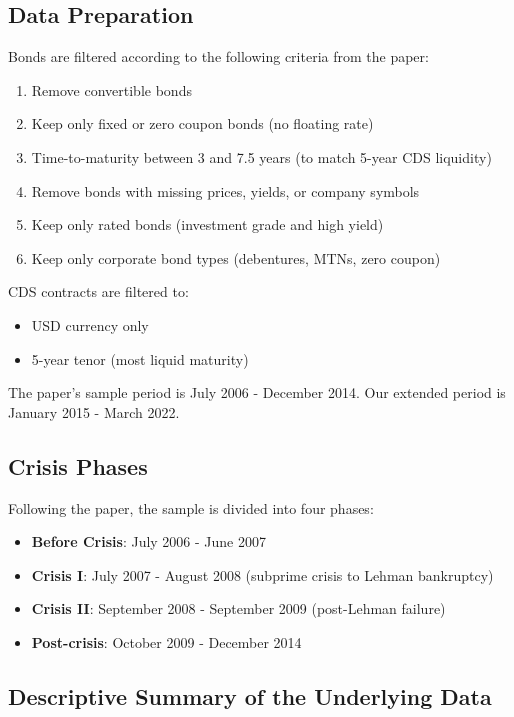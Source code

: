 \documentclass{article}
\begin{document}
\subsection{Data Preparation}

Bonds are filtered according to the following criteria from the paper:
\begin{enumerate}
    \item Remove convertible bonds
    \item Keep only fixed or zero coupon bonds (no floating rate)
    \item Time-to-maturity between 3 and 7.5 years (to match 5-year CDS liquidity)
    \item Remove bonds with missing prices, yields, or company symbols
    \item Keep only rated bonds (investment grade and high yield)
    \item Keep only corporate bond types (debentures, MTNs, zero coupon)
\end{enumerate}

CDS contracts are filtered to:
\begin{itemize}
    \item USD currency only
    \item 5-year tenor (most liquid maturity)
\end{itemize}

The paper's sample period is July 2006 - December 2014. Our extended period is January 2015 - March 2022.

\subsection{Crisis Phases}

Following the paper, the sample is divided into four phases:
\begin{itemize}
    \item \textbf{Before Crisis}: July 2006 - June 2007
    \item \textbf{Crisis I}: July 2007 - August 2008 (subprime crisis to Lehman bankruptcy)
    \item \textbf{Crisis II}: September 2008 - September 2009 (post-Lehman failure)
    \item \textbf{Post-crisis}: October 2009 - December 2014
\end{itemize}

\subsection{Descriptive Summary of the Underlying Data}
\end{document}
